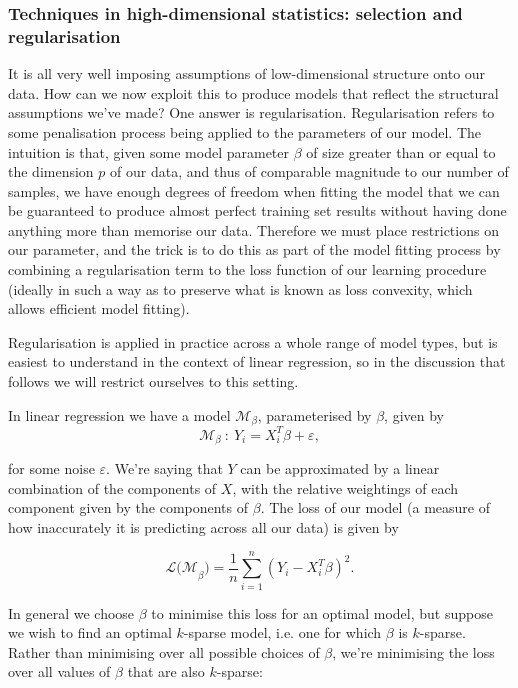 \documentclass[thesis.tex]{subfiles}
\begin{document}
\subsubsection{Techniques in high-dimensional statistics: selection and regularisation}
It is all very well imposing assumptions of low-dimensional structure onto our data. How can we now exploit this to produce models that reflect the structural assumptions we've made? One answer is regularisation. Regularisation refers to some penalisation process being applied to the parameters of our model. The intuition is that, given some model parameter $\beta$ of size greater than or equal to the dimension $p$ of our data, and thus of comparable magnitude to our number of samples, we have enough degrees of freedom when fitting the model that we can be guaranteed to produce almost perfect training set results without having done anything more than memorise our data. Therefore we must place restrictions on our parameter, and the trick is to do this as part of the model fitting process by combining a regularisation term to the loss function of our learning procedure (ideally in such a way as to preserve what is known as loss convexity, which allows efficient model fitting).

Regularisation is applied in practice across a whole range of model types, but is easiest to understand in the context of linear regression, so in the discussion that follows we will restrict ourselves to this setting. 

In linear regression we have a model $\mathcal{M}_\beta$, parameterised by $\beta$, given by 
\begin{equation}
\mathcal{M}_\beta \ : \ Y_i = X_i^T\beta + \varepsilon ,
\end{equation}

for some noise $\varepsilon$. We're saying that $Y$ can be approximated by a linear combination of the components of $X$, with the relative weightings of each component given by the components of $\beta$. The loss of our model (a measure of how inaccurately it is predicting across all our data) is given by 

\begin{equation}
\mathcal{L(M}_\beta) = \frac{1}{n}\sum\limits_{i=1}^{n} (Y_i - X_i^T\beta)^2. 
\end{equation}

In general we choose $\beta$ to minimise this loss for an optimal model, but suppose we wish to find an optimal $k$-sparse model, i.e. one for which $\beta$ is $k$-sparse. Rather than minimising over all possible choices of $\beta$, we're minimising the loss over all values of $\beta$ that are also $k$-sparse:
\end{document}
